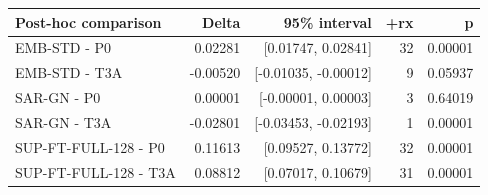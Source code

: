 \begin{tabular}{lrrrr}
\toprule
Post-hoc comparison & Delta & 95\% interval & +rx & p \\
\midrule
EMB-STD - P0 & 0.02281 & [0.01747, 0.02841] & 32 & 0.00001 \\
EMB-STD - T3A & -0.00520 & [-0.01035, -0.00012] & 9 & 0.05937 \\
SAR-GN - P0 & 0.00001 & [-0.00001, 0.00003] & 3 & 0.64019 \\
SAR-GN - T3A & -0.02801 & [-0.03453, -0.02193] & 1 & 0.00001 \\
SUP-FT-FULL-128 - P0 & 0.11613 & [0.09527, 0.13772] & 32 & 0.00001 \\
SUP-FT-FULL-128 - T3A & 0.08812 & [0.07017, 0.10679] & 31 & 0.00001 \\
\bottomrule\end{tabular}
